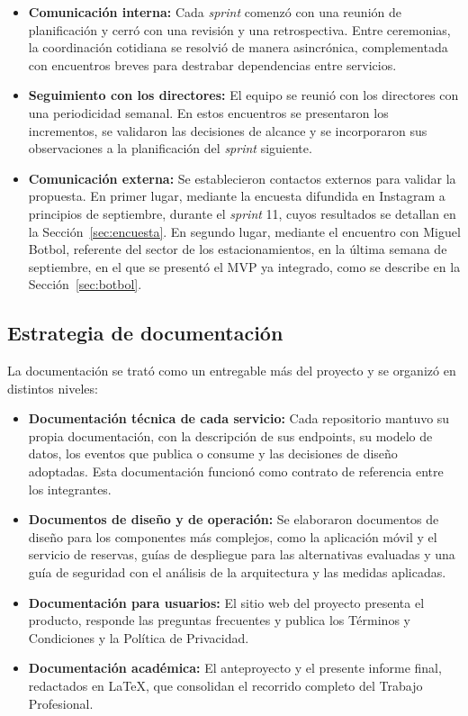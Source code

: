 \begin{itemize}
    \item \textbf{Comunicación interna:} Cada \textit{sprint} comenzó con una reunión de planificación y cerró con una revisión y una retrospectiva. Entre ceremonias, la coordinación cotidiana se resolvió de manera asincrónica, complementada con encuentros breves para destrabar dependencias entre servicios.
    \item \textbf{Seguimiento con los directores:} El equipo se reunió con los directores con una periodicidad semanal. En estos encuentros se presentaron los incrementos, se validaron las decisiones de alcance y se incorporaron sus observaciones a la planificación del \textit{sprint} siguiente.
    \item \textbf{Comunicación externa:} Se establecieron contactos externos para validar la propuesta. En primer lugar, mediante la encuesta difundida en Instagram a principios de septiembre, durante el \textit{sprint} 11, cuyos resultados se detallan en la Sección~\ref{sec:encuesta}. En segundo lugar, mediante el encuentro con Miguel Botbol, referente del sector de los estacionamientos, en la última semana de septiembre, en el que se presentó el MVP ya integrado, como se describe en la Sección~\ref{sec:botbol}.
\end{itemize}

\subsection{Estrategia de documentación}

La documentación se trató como un entregable más del proyecto y se organizó en distintos niveles:

\begin{itemize}
    \item \textbf{Documentación técnica de cada servicio:} Cada repositorio mantuvo su propia documentación, con la descripción de sus endpoints, su modelo de datos, los eventos que publica o consume y las decisiones de diseño adoptadas. Esta documentación funcionó como contrato de referencia entre los integrantes.
    \item \textbf{Documentos de diseño y de operación:} Se elaboraron documentos de diseño para los componentes más complejos, como la aplicación móvil y el servicio de reservas, guías de despliegue para las alternativas evaluadas y una guía de seguridad con el análisis de la arquitectura y las medidas aplicadas.
    \item \textbf{Documentación para usuarios:} El sitio web del proyecto presenta el producto, responde las preguntas frecuentes y publica los Términos y Condiciones y la Política de Privacidad.
    \item \textbf{Documentación académica:} El anteproyecto y el presente informe final, redactados en \LaTeX, que consolidan el recorrido completo del Trabajo Profesional.
\end{itemize}
